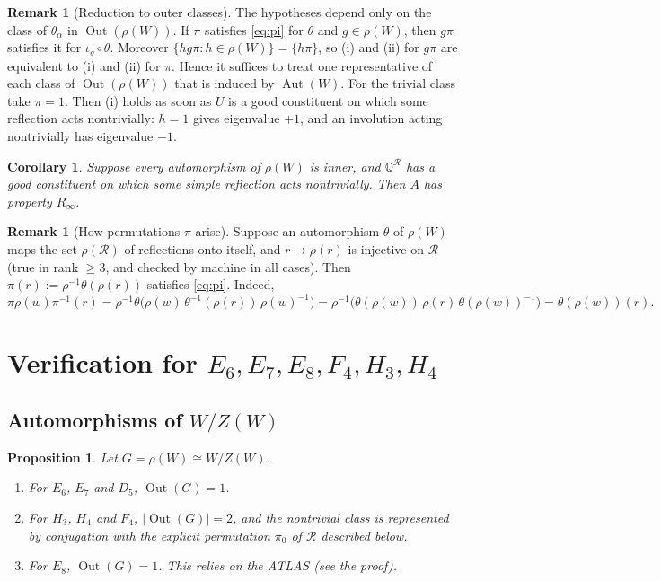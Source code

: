 \documentclass[11pt]{amsart}
\newtheorem{proposition}[theorem]{Proposition}
\newtheorem{corollary}[theorem]{Corollary}
\theoremstyle{definition}
\newtheorem{remark}[theorem]{Remark}
\newcommand{\Q}{\mathbb{Q}}
\newcommand{\R}{\mathcal{R}}
\newcommand{\Aut}{\operatorname{Aut}}
\newcommand{\Out}{\operatorname{Out}}
\newcommand{\Rinf}{R_\infty}
\begin{document}
\begin{remark}[Reduction to outer classes]\label{rem:reduce}
The hypotheses depend only on the class of $\theta_\alpha$ in $\Out(\rho(W))$. If $\pi$ satisfies \eqref{eq:pi}
for $\theta$ and $g\in\rho(W)$, then $g\pi$ satisfies it for $\iota_g\circ\theta$. Moreover
$\{hg\pi:h\in\rho(W)\}=\{h\pi\}$, so (i) and (ii) for $g\pi$ are equivalent to (i) and (ii) for $\pi$. Hence it
suffices to treat one representative of each class of $\Out(\rho(W))$ that is induced by $\Aut(W)$. For the trivial
class take $\pi=1$. Then (i) holds as soon as $U$ is a good constituent on which some reflection acts
nontrivially: $h=1$ gives eigenvalue $+1$, and an involution acting nontrivially has eigenvalue $-1$.
\end{remark}

\begin{corollary}\label{cor:inner}
Suppose every automorphism of $\rho(W)$ is inner, and $\Q^\R$ has a good constituent on which some simple
reflection acts nontrivially. Then $A$ has property $\Rinf$.
\end{corollary}

\begin{remark}[How permutations $\pi$ arise]\label{rem:pi-refl}
Suppose an automorphism $\theta$ of $\rho(W)$ maps the set $\rho(\R)$ of reflections onto itself, and
$r\mapsto\rho(r)$ is injective on $\R$ (true in rank $\ge3$, and checked by machine in all cases). Then
$\pi(r):=\rho^{-1}\theta(\rho(r))$ satisfies \eqref{eq:pi}. Indeed,
\[\pi\rho(w)\pi^{-1}(r)=\rho^{-1}\theta\bigl(\rho(w)\,\theta^{-1}(\rho(r))\,\rho(w)^{-1}\bigr)=\rho^{-1}\bigl(\theta(\rho(w))\,\rho(r)\,\theta(\rho(w))^{-1}\bigr)=\theta(\rho(w))(r).\]
\end{remark}

\section{Verification for $E_6,E_7,E_8,F_4,H_3,H_4$}\label{sec:verify}

\subsection{Automorphisms of $W/Z(W)$}
\begin{proposition}\label{prop:out}
Let $G=\rho(W)\cong W/Z(W)$.
\begin{enumerate}[label=(\alph*)]
\item For $E_6$, $E_7$ and $D_5$, $\Out(G)=1$.
\item For $H_3$, $H_4$ and $F_4$, $|\Out(G)|=2$, and the nontrivial class is represented by conjugation with the
explicit permutation $\pi_0$ of $\R$ described below.
\item For $E_8$, $\Out(G)=1$. This relies on the ATLAS (see the proof).
\end{enumerate}
\end{proposition}
\end{document}

